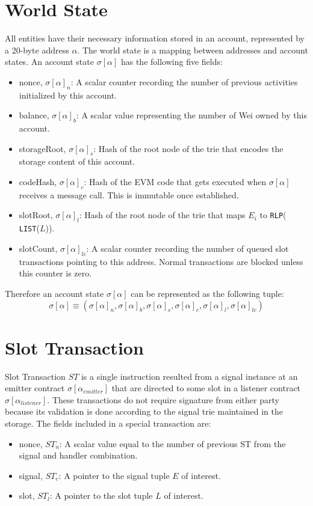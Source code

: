 \documentclass{article}
\begin{document}
\section{World State}
All entities have their necessary information stored in an account, represented by a 20-byte address $\alpha$. The world state is a mapping between addresses and account states. An account state $\sigma[\alpha]$ has the following five fields:
\begin{itemize}
    \item nonce, $\sigma[\alpha]_{n}$: A scalar counter recording the number of previous activities initialized by this account.
    \item balance, $\sigma[\alpha]_{b}$: A scalar value representing the number of Wei owned by this account. 
    \item storageRoot, $\sigma[\alpha]_{s}$: Hash of the root node of the trie that encodes the storage content of this account.
    \item codeHash, $\sigma[\alpha]_{c}$: Hash of the EVM code that gets executed when $\sigma[\alpha]$ receives a message call. This is immutable once established. 
    \item slotRoot, $\sigma[\alpha]_{l}$: Hash of the root node of the trie that maps $E_{i}$ to \texttt{RLP}(
    \texttt{LIST}($L$)). 
    \item slotCount, $\sigma[\alpha]_{lc}$: A scalar counter recording the number of queued slot transactions pointing to this address. Normal transactions are blocked unless this counter is zero.
\end{itemize}
Therefore an account state $\sigma[\alpha]$ can be represented as the following tuple:
\begin{equation*}
    \sigma[\alpha] \equiv (\sigma[\alpha]_n, \sigma[\alpha]_b, \sigma[\alpha]_s, \sigma[\alpha]_c, \sigma[\alpha]_l, \sigma[\alpha]_{lc})
\end{equation*}


\section{Slot Transaction}
Slot Transaction $ST$ is a single instruction resulted from a signal instance at an emitter contract $\sigma[\alpha_{emitter}]$ that are directed to some slot in a listener contract $\sigma[\alpha_{listener}]$. These transactions do not require signature from either party because its validation is done according to the signal trie maintained in the storage. The fields included in a special transaction are:
\begin{itemize}
    \item nonce, $ST_n$: A scalar value equal to the number of previous ST from the signal and handler combination. 
    \item signal, $ST_e$: A pointer to the signal tuple $E$ of interest.
    \item slot, $ST_l$: A pointer to the slot tuple $L$ of interest.
\end{itemize}
\end{document}
